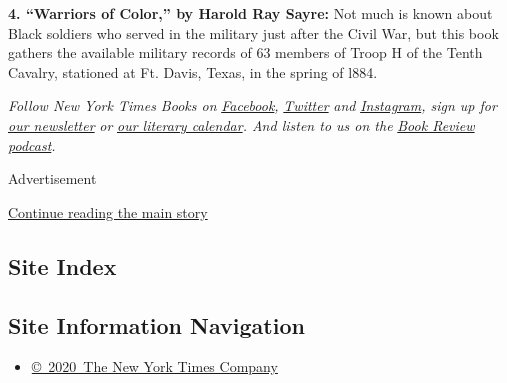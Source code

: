 \textbf{4. ``Warriors of Color,'' by Harold Ray Sayre:} Not much is
known about Black soldiers who served in the military just after the
Civil War, but this book gathers the available military records of 63
members of Troop H of the Tenth Cavalry, stationed at Ft. Davis, Texas,
in the spring of l884.

\emph{Follow New York Times Books on}
\href{https://www.facebook.com/nytbooks/}{\emph{Facebook}}\emph{,}
\href{https://twitter.com/nytimesbooks}{\emph{Twitter}} \emph{and}
\href{https://www.instagram.com/nytbooks/}{\emph{Instagram}}\emph{, sign
up for}
\href{https://www.nytimes.com/newsletters/books-review}{\emph{our
newsletter}} \emph{or}
\href{https://www.nytimes.com/interactive/2017/books/books-calendar.html}{\emph{our
literary calendar}}\emph{. And listen to us on the}
\href{https://www.nytimes.com/column/book-review-podcast}{\emph{Book
Review podcast}}\emph{.}

Advertisement

\protect\hyperlink{after-bottom}{Continue reading the main story}

\hypertarget{site-index}{%
\subsection{Site Index}\label{site-index}}

\hypertarget{site-information-navigation}{%
\subsection{Site Information
Navigation}\label{site-information-navigation}}

\begin{itemize}
\tightlist
\item
  \href{https://help.nytimes.com/hc/en-us/articles/115014792127-Copyright-notice}{©~2020~The
  New York Times Company}
\end{itemize}

